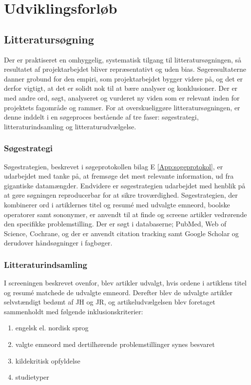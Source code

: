 \chapter{Udviklingsforløb}

\section{Litteratursøgning}
 Der er praktiseret en omhyggelig, systematisk tilgang til litteratursøgningen, så resultatet af projektarbejdet bliver repræsentativt og uden bias. Søgeresultaterne danner grobund for den empiri, som projektarbejdet bygger videre på, og det er derfor vigtigt, at det er solidt nok til at bære analyser og konklusioner. Der er med andre ord, søgt, analyseret og vurderet ny viden som er relevant inden for projektets fagområde og rammer. For at overskueliggøre litteratursøgningen, er denne inddelt i en søgeproces bestående af tre faser: søgestrategi, litteraturindsamling og litteraturudvælgelse. 
 
	\subsection{Søgestrategi}
	Søgestrategien, beskrevet i søgeprotokollen bilag E \ref{App:sogeprotokol}, er udarbejdet med tanke på, at fremsøge det mest relevante information, ud fra gigantiske datamængder. Endvidere er søgestrategien udarbejdet med henblik på at gøre søgningen reproducerbar for at sikre troværdighed.  
	Søgestrategien, der kombinerer ord i artiklernes titel og resumé med udvalgte emneord, boolske operatorer samt sononymer, er anvendt til at finde og screene artikler vedrørende den specifikke problemstilling. Der er søgt i databaserne; PubMed, Web of Science, Cochrane, og der er anvendt citation tracking samt Google Scholar og derudover håndsøgninger i fagbøger.  
	
	\subsection{Litteraturindsamling}
	I screeningen beskrevet ovenfor, blev artikler udvalgt, hvis ordene i artiklens titel og resumé matchede de udvalgte emneord. Derefter blev de udvalgte artikler selvstændigt bedømt af JH og JR, og artikeludvælgelsen blev foretaget sammenholdt med følgende inklusionskriterier:
	
		\begin{enumerate}
			\item engelsk el. nordisk sprog 
			\item valgte emneord med dertilhørende problemstillinger synes besvaret
			\item kildekritisk opfyldelse
			\item studietyper
		\end{enumerate} 
		
